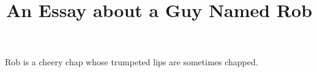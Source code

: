 \documentclass[12pt]{article}
\title{An Essay about a Guy Named Rob}
\begin{document}
\maketitle

Rob is a cheery chap whose trumpeted lips are sometimes chapped.

\end{document}
